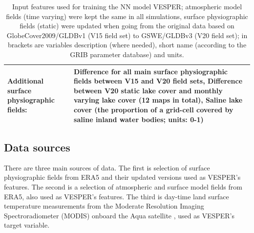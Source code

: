 \documentclass[hess, twostagejnl]{copernicus}
\begin{document}
\begin{table}
\begin{tabularx}{\textwidth}{lX}
		\\
		Additional surface physiographic fields:               & Difference for all main surface physiographic fields between V15 and V20 field sets, \newline 
		Difference between V20 static lake cover and monthly varying lake cover (12 maps in total),\newline 
		Saline lake cover (the proportion of a grid-cell covered by saline inland water bodies; units: 0-1)
		 \\
		\hline
	\end{tabularx}
\caption{Input features used for training the NN model VESPER; atmospheric model fields (time varying) were kept the same in all simulations,  surface  physiographic  fields  (static)  were  updated  when  going  from  the  original  data  based  on GlobeCover2009/GLDBv1 (V15 field set) to GSWE/GLDBv3 (V20 field set); in brackets are variables description (where needed), short name (according to the GRIB parameter database) and units.
}
\label{table:definitions}
\end{table}

\subsection{Data sources }

There are three main sources of data. The first is selection of surface physiographic fields from ERA5 \citep{Hersbach} and their updated versions \citep{Choulga2019,Boussetta2021,Mu2021} used as VESPER’s features.
The second is a selection of atmospheric and surface model fields from ERA5, also used as VESPER’s features. The third is day-time land surface temperature measurements from the Moderate Resolution Imaging Spectroradiometer (MODIS) onboard the Aqua satellite \citep{MODIS}, used as VESPER’s target variable.
\end{document}
